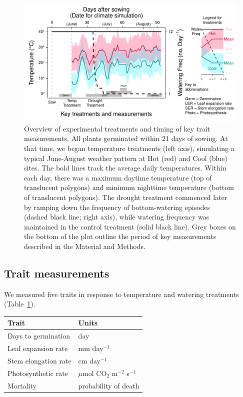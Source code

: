 \documentclass[11pt, oneside]{article}
\begin{document}
\begin{figure}[h!]
	\centerline{\includegraphics[width=1\textwidth]{Figures/Figure_ExptlDes.pdf}}
	\fontsize{10}{12}
	\selectfont
	\caption[Experimental Design]{Overview of experimental treatments and timing of key trait measurements. All plants germinated within 21 days of sowing. At that time, we began temperature treatments (left axis), simulating a typical June-August weather pattern at Hot (red) and Cool (blue) sites. The bold lines track the average daily temperatures. Within each day, there was a maximum daytime temperature (top of translucent polygons) and minimum nighttime temperature (bottom of translucent polygons). The drought treatment commenced later by ramping down the frequency of bottom-watering episodes (dashed black line; right axis), while watering frequency was maintained in the control treatment (solid black line). Grey boxes on the bottom of the plot outline the period of key measurements described in the Material and Methods.}
	\label{fig:Fig_ExptlDes}
\end{figure}

\subsection*{Trait measurements}

We measured five traits in response to temperature and watering treatments (Table~\ref{table:Table_traits}).


\begin{table}[ht]
   \centering
   \begin{tabular}{@{} ll @{}}
      \toprule
  Trait & Units \\
      \midrule
  Days to germination  & day \\
  Leaf expansion rate  &  mm day$^{-1}$  \\
  Stem elongation rate  &  cm day$^{-1}$  \\
  Photosynthetic rate &  $\mu$mol CO$_2$ m$^{-2}$ s$^{-1}$\\
  Mortality & probability of death  \\
	    \bottomrule
   \end{tabular}
   \label{table:Table_traits}
\end{table}
\end{document}
